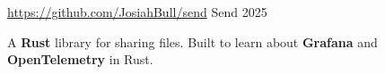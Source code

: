 \begin{cventries}
  \cventry
    {\href{https://github.com/JosiahBull/send}{\faLink \space https://github.com/JosiahBull/send}}
    {Send}
    {}
    {2025}
    {
      \begin{cvitems}
        \item {A \textbf{Rust} library for sharing files. Built to learn about \textbf{Grafana} and \textbf{OpenTelemetry} in Rust.}
      \end{cvitems}
    }





\end{cventries}
